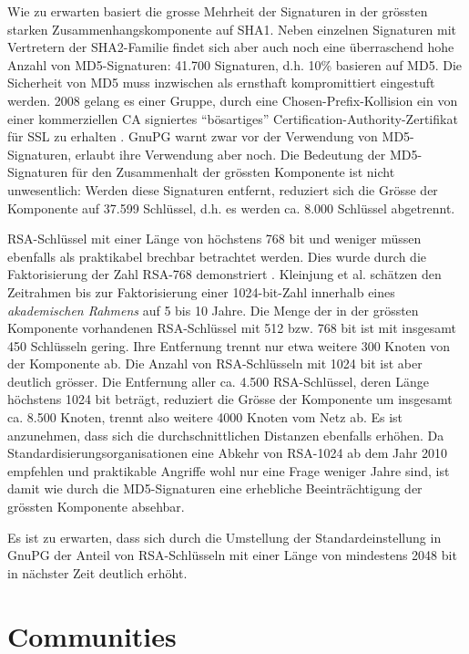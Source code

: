 Wie zu erwarten basiert die grosse Mehrheit der Signaturen in der
gr\"ossten starken Zusammenhangskomponente auf SHA1. Neben einzelnen
Signaturen mit Vertretern der SHA2-Familie findet sich aber auch noch
eine \"uberraschend hohe Anzahl von MD5-Signaturen: 41.700 Signaturen,
d.h. 10\% basieren auf MD5. Die Sicherheit von MD5 muss inzwischen als
ernsthaft kompromittiert eingestuft werden. 2008 gelang es einer
Gruppe, durch eine Chosen-Prefix-Kollision ein von einer kommerziellen
CA signiertes ``b\"osartiges'' Certification-Authority-Zertifikat
f\"ur SSL zu erhalten \cite{Stevens2009}. GnuPG warnt zwar vor der
Verwendung von MD5-Signaturen, erlaubt ihre Verwendung aber noch. Die
Bedeutung der MD5-Signaturen f\"ur den Zusammenhalt der gr\"ossten
Komponente ist nicht unwesentlich: Werden diese Signaturen entfernt,
reduziert sich die Gr\"osse der Komponente auf 37.599 Schl\"ussel,
d.h. es werden ca. 8.000 Schl\"ussel abgetrennt. 

RSA-Schl\"ussel mit einer L\"ange von h\"ochstens 768 bit und weniger
m\"ussen ebenfalls als praktikabel brechbar betrachtet werden. Dies
wurde durch die Faktorisierung der Zahl RSA-768 demonstriert
\cite{Kleinjung2010}. Kleinjung et al. sch\"atzen den Zeitrahmen bis
zur Faktorisierung einer 1024-bit-Zahl innerhalb eines
\emph{akademischen Rahmens} auf 5 bis 10 Jahre. Die Menge der in der
gr\"ossten Komponente vorhandenen RSA-Schl\"ussel mit 512 bzw. 768 bit
ist mit insgesamt 450 Schl\"usseln gering. Ihre Entfernung trennt nur
etwa weitere 300 Knoten von der Komponente ab. Die Anzahl von
RSA-Schl\"usseln mit 1024 bit ist aber deutlich gr\"osser. Die
Entfernung aller ca. 4.500 RSA-Schl\"ussel, deren L\"ange h\"ochstens
1024 bit betr\"agt, reduziert die Gr\"osse der Komponente um insgesamt
ca. 8.500 Knoten, trennt also weitere 4000 Knoten vom Netz ab. Es ist
anzunehmen, dass sich die durchschnittlichen Distanzen ebenfalls
erh\"ohen. Da Standardisierungsorganisationen eine Abkehr von RSA-1024
ab dem Jahr 2010 empfehlen\cite{NIST2007} und praktikable Angriffe
wohl nur eine Frage weniger Jahre sind, ist damit wie durch die
MD5-Signaturen eine erhebliche Beeintr\"achtigung der gr\"ossten
Komponente absehbar.

Es ist zu erwarten, dass sich durch die Umstellung der
Standardeinstellung in GnuPG der Anteil von RSA-Schl\"usseln mit
einer L\"ange von mindestens 2048 bit in n\"achster Zeit deutlich
erh\"oht.

\section{Communities}
\label{sec:result-zusamm-und-comm}

